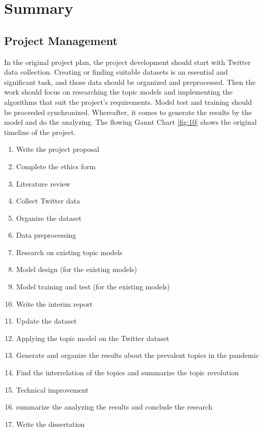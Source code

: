 \chapter{Summary}
\label{ch:summary}

\section{Project Management}

In the original project plan, the project development should start with Twitter data collection. Creating or finding suitable datasets is an essential and significant task, and those data should be organized and preprocessed. Then the work should focus on researching the topic models and implementing the algorithms that suit the project's requirements. Model test and training should be proceeded synchronized. Whereafter, it comes to generate the results by the model and do the analyzing. The flowing Gannt Chart \ref{fig:10} shows the original timeline of the project.


\begin{enumerate} [A]
    \item Write the project proposal
    \item Complete the ethics form
    \item Literature review
    \item Collect Twitter data
    \item Organize the dataset
    \item Data preprocessing
    \item Research on existing topic models
    \item Model design (for the existing models)
    \item Model training and test (for the existing models)
    \item Write the interim report
    \item Update the dataset
    \item Applying the topic model on the Twitter dataset
    \item Generate and organize the results about the prevalent topics in the pandemic
    \item Find the interrelation of the topics and summarize the topic revolution
    \item Technical improvement
    \item summarize the analyzing the results and conclude the research
    \item Write the dissertation
\end{enumerate}

